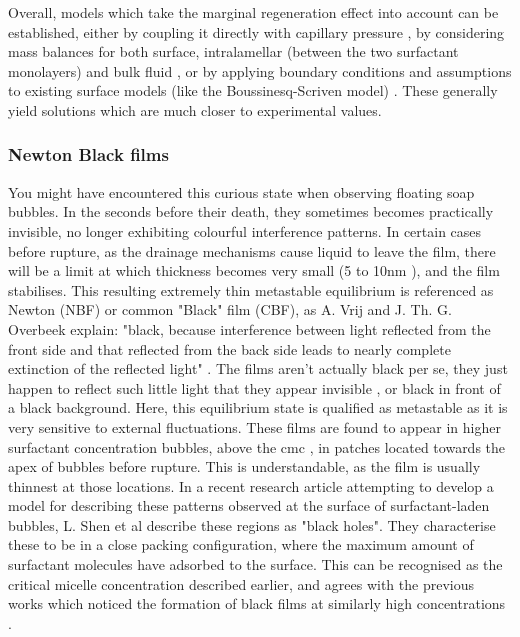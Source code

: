 \documentclass[a4paper,12pt]{article}
\numberwithin{equation}{section}
\numberwithin{figure}{section}
\numberwithin{table}{section}
\begin{document}
Overall, models which take the marginal regeneration effect into account can be established, either by coupling it directly with capillary pressure \cite{Lhuissier2011}, by considering mass balances for both surface, intralamellar (between the two surfactant monolayers) and bulk fluid \cite{Nierstrasz1999}, or by applying boundary conditions and assumptions to existing surface models (like the Boussinesq-Scriven model) \cite{Bhamla2017}. These generally yield solutions which are much closer to experimental values.

\subsubsection{Newton Black films}
\label{sec:blackfilms}

You might have encountered this curious state when observing floating soap bubbles. In the seconds before their death, they sometimes becomes practically invisible, no longer exhibiting colourful interference patterns. In certain cases before rupture, as the drainage mechanisms cause liquid to leave the film, there will be a limit at which thickness becomes very small (5 to 10nm \cite{Casteletto2003}), and the film stabilises. This resulting extremely thin metastable equilibrium is referenced as Newton (NBF) or common "Black" film (CBF), as A. Vrij and J. Th. G. Overbeek explain: "black, because interference between light reflected from the front side and that reflected from the back side leads to nearly complete extinction of the reflected light" \cite{Vrij1968}. The films aren't actually black per se, they just happen to reflect such little light that they appear invisible \cite{Langevin1994}, or black in front of a black background. Here, this equilibrium state is qualified as metastable as it is very sensitive to external fluctuations. These films are found to appear in higher surfactant concentration bubbles, above the cmc \cite{Bhamla2017, Manev1974}, in patches located towards the apex of bubbles before rupture. This is understandable, as the film is usually thinnest at those locations. In a recent research article attempting to develop a model for describing these patterns observed at the surface of surfactant-laden bubbles, L. Shen et al \cite{Shen2020} describe these regions as "black holes". They characterise these to be in a close packing configuration, where the maximum amount of surfactant molecules have adsorbed to the surface. This can be recognised as the critical micelle concentration described earlier, and agrees with the previous works which noticed the formation of black films at similarly high concentrations \cite{Bhamla2017, Manev1974}.
\end{document}
